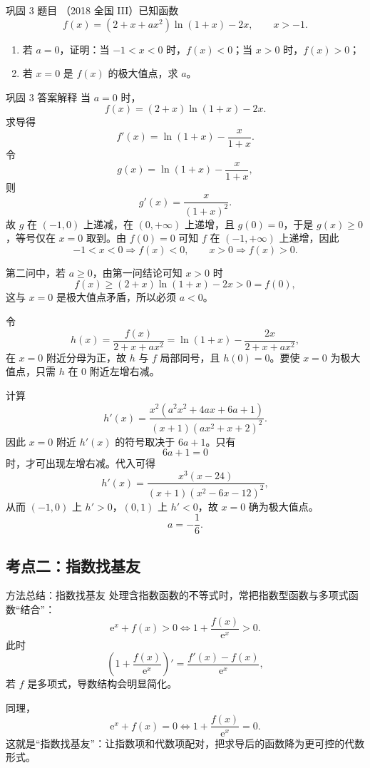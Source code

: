 ﻿\documentclass[aspectratio=169,10pt]{ctexbeamer}
\newcommand{\e}{\mathrm e}
\begin{document}
\begin{frame}{巩固 3 题目}
\small
（2018 全国 III）已知函数
\[
f(x)=(2+x+ax^2)\ln(1+x)-2x,\qquad x>-1.
\]
\begin{enumerate}
  \item 若 $a=0$，证明：当 $-1<x<0$ 时，$f(x)<0$；当 $x>0$ 时，$f(x)>0$；
  \item 若 $x=0$ 是 $f(x)$ 的极大值点，求 $a$。
\end{enumerate}
\end{frame}

\begin{frame}[allowframebreaks]{巩固 3 答案解释}
\small
当 $a=0$ 时，
\[
f(x)=(2+x)\ln(1+x)-2x.
\]
求导得
\[
f'(x)=\ln(1+x)-\frac{x}{1+x}.
\]
令
\[
g(x)=\ln(1+x)-\frac{x}{1+x},
\]
则
\[
g'(x)=\frac{x}{(1+x)^2}.
\]
故 $g$ 在 $(-1,0)$ 上递减，在 $(0,+\infty)$ 上递增，且 $g(0)=0$，于是 $g(x)\ge0$，等号仅在 $x=0$ 取到。由 $f(0)=0$ 可知 $f$ 在 $(-1,+\infty)$ 上递增，因此
\[
-1<x<0\Rightarrow f(x)<0,\qquad x>0\Rightarrow f(x)>0.
\]

\framebreak

第二问中，若 $a\ge0$，由第一问结论可知 $x>0$ 时
\[
f(x)\ge (2+x)\ln(1+x)-2x>0=f(0),
\]
这与 $x=0$ 是极大值点矛盾，所以必须 $a<0$。

令
\[
h(x)=\frac{f(x)}{2+x+ax^2}
=\ln(1+x)-\frac{2x}{2+x+ax^2},
\]
在 $x=0$ 附近分母为正，故 $h$ 与 $f$ 局部同号，且 $h(0)=0$。要使 $x=0$ 为极大值点，只需 $h$ 在 $0$ 附近左增右减。

计算
\[
h'(x)=\frac{x^2(a^2x^2+4ax+6a+1)}{(x+1)(ax^2+x+2)^2}.
\]
因此 $x=0$ 附近 $h'(x)$ 的符号取决于 $6a+1$。只有
\[
6a+1=0
\]
时，才可出现左增右减。代入可得
\[
h'(x)=\frac{x^3(x-24)}{(x+1)(x^2-6x-12)^2},
\]
从而 $(-1,0)$ 上 $h'>0$，$(0,1)$ 上 $h'<0$，故 $x=0$ 确为极大值点。
\[
\boxed{a=-\frac16}.
\]
\end{frame}

\subsection{考点二：指数找基友}

\begin{frame}{方法总结：指数找基友}
\small
处理含指数函数的不等式时，常把指数型函数与多项式函数“结合”：
\[
\e^x+f(x)>0
\Longleftrightarrow
1+\frac{f(x)}{\e^x}>0.
\]
此时
\[
\left(1+\frac{f(x)}{\e^x}\right)'
=\frac{f'(x)-f(x)}{\e^x},
\]
若 $f$ 是多项式，导数结构会明显简化。

同理，
\[
\e^x+f(x)=0
\Longleftrightarrow
1+\frac{f(x)}{\e^x}=0.
\]
这就是“指数找基友”：让指数项和代数项配对，把求导后的函数降为更可控的代数形式。
\end{frame}
\end{document}
